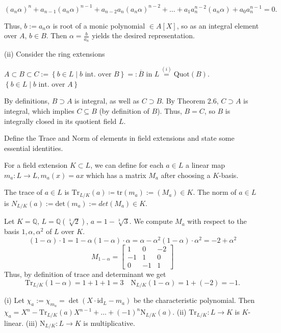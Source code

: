 \[
(a_n \alpha)^n + a_{n-1}(a_n \alpha)^{n-1} + a_{n-2} a_n (a_n \alpha)^{n-2} + \ldots + a_1 a_n^{n-2} (a_n \alpha) + a_0 a_n^{n-1} = 0.
\]

Thus, \( b := a_n \alpha \) is root of a monic polynomial \( \in A[X] \), so as an integral element over \( A \), \( b \in B \). Then \( \alpha = \frac{b}{a_n} \) yields the desired representation.

(ii) Consider the ring extensions

\(
A \subset B \subset C := \left\{ b \in L \mid b \text{ int. over } B \right\} =: \overline{B} \text{ in } L \overset{(i)}{=} \text{Quot}(B).
\)
\(
\left\{ b \in L \mid b \text{ int. over } A \right\}
\)

By definitions, \( B \supset A \) is integral, as well as \( C \supset B \). By Theorem 2.6, \( C \supset A \) is integral, which implies \( C \subseteq B \) (by definition of \( B \)). Thus, \( B = C \), so \( B \) is integrally closed in its quotient field \( L \).




Define the Trace and Norm of elements in field extensions
and state some essential identities.

For a field extension \( K \subset L \), we can define for each \( a \in L \)
a linear map \( m_a: L \to L, m_a(x) = ax \) which has a matrix \( M_a \) after choosing
a \( K \)-basis.

The trace of \( a ∈ L \) is \( \text{Tr}_{L/K}(a) \coloneqq \text{tr}(m_a) := (M_a) ∈ K\).
The norm of \( a ∈ L\) is \( N_{L/K}(a) := \text{det}(m_a) := det(M_a) ∈ K \).

Let \( K = \mathbb{Q} \), \( L = \mathbb{Q}(\sqrt[3]{2}) \), \( a = 1 - \sqrt[3]{3} \).
We compute \( M_a \) with respect to the basis \( 1, \alpha, \alpha^2 \) of \( L \) over \( K \).
\[
(1 - \alpha) \cdot 1 = 1 - \alpha
(1 - \alpha) \cdot \alpha = \alpha - \alpha^2
(1 - \alpha) \cdot \alpha^2 = -2 + \alpha^2
\]
\[
M_{1-\alpha} = \begin{bmatrix} 1 & 0 & -2 \\ -1 & 1 & 0 \\ 0 & -1 & 1 \end{bmatrix}
\]
Thus, by definition of trace and determinant we get
\[
\text{Tr}_{L/K}(1-\alpha) = 1 + 1 + 1 = 3 \quad \text{N}_{L/K}(1-\alpha) = 1 + (-2) = -1.
\]


(i) 
Let \(\chi_a := \chi_{m_a} = \det(X \cdot \text{id}_L - m_a)\) be the characteristic polynomial. 
Then 
\(
\chi_a = X^n - \text{Tr}_{L/K}(a)X^{n-1} + \ldots + (-1)^n \text{N}_{L/K}(a).
\)
(ii) \(\text{Tr}_{L/K} : L \to K\) is \(K\)-linear.
(iii) \(\text{N}_{L/K} : L \to K\) is multiplicative.

